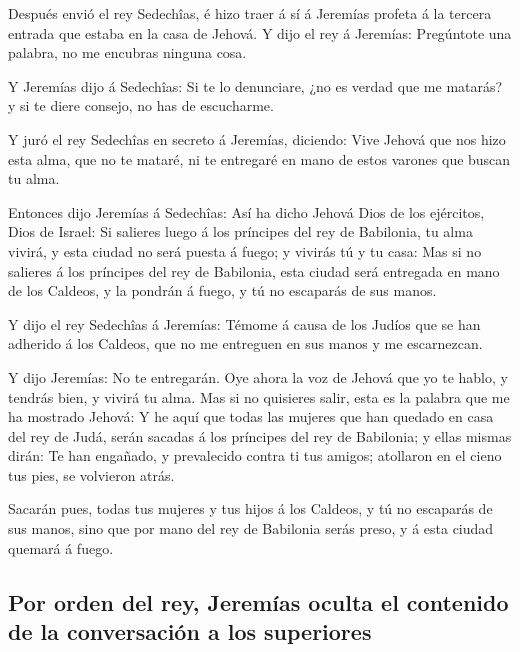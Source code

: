  Después envió el rey Sedechîas, é hizo traer á sí á
Jeremías profeta á la tercera entrada que estaba en la casa de Jehová. Y
dijo el rey á Jeremías: Pregúntote una palabra, no me encubras ninguna
cosa.

 Y Jeremías dijo á Sedechîas: Si te lo denunciare, ¿no es
verdad que me matarás? y si te diere consejo, no has de escucharme.

 Y juró el rey Sedechîas en secreto á Jeremías, diciendo:
Vive Jehová que nos hizo esta alma, que no te mataré, ni te entregaré en
mano de estos varones que buscan tu alma.

 Entonces dijo Jeremías á Sedechîas: Así ha dicho Jehová
Dios de los ejércitos, Dios de Israel: Si salieres luego á los príncipes
del rey de Babilonia, tu alma vivirá, y esta ciudad no será puesta á
fuego; y vivirás tú y tu casa:  Mas si no salieres á los
príncipes del rey de Babilonia, esta ciudad será entregada en mano de
los Caldeos, y la pondrán á fuego, y tú no escaparás de sus manos.

 Y dijo el rey Sedechîas á Jeremías: Témome á causa de
los Judíos que se han adherido á los Caldeos, que no me entreguen en sus
manos y me escarnezcan.

 Y dijo Jeremías: No te entregarán. Oye ahora la voz de
Jehová que yo te hablo, y tendrás bien, y vivirá tu alma.
 Mas si no quisieres salir, esta es la palabra que me ha
mostrado Jehová:  Y he aquí que todas las mujeres que han
quedado en casa del rey de Judá, serán sacadas á los príncipes del rey
de Babilonia; y ellas mismas dirán: Te han engañado, y prevalecido
contra ti tus amigos; atollaron en el cieno tus pies, se volvieron
atrás.

 Sacarán pues, todas tus mujeres y tus hijos á los
Caldeos, y tú no escaparás de sus manos, sino que por mano del rey de
Babilonia serás preso, y á esta ciudad quemará á fuego.

\hypertarget{por-orden-del-rey-jeremuxedas-oculta-el-contenido-de-la-conversaciuxf3n-a-los-superiores}{%
\subsection{Por orden del rey, Jeremías oculta el contenido de la
conversación a los
superiores}\label{por-orden-del-rey-jeremuxedas-oculta-el-contenido-de-la-conversaciuxf3n-a-los-superiores}}

